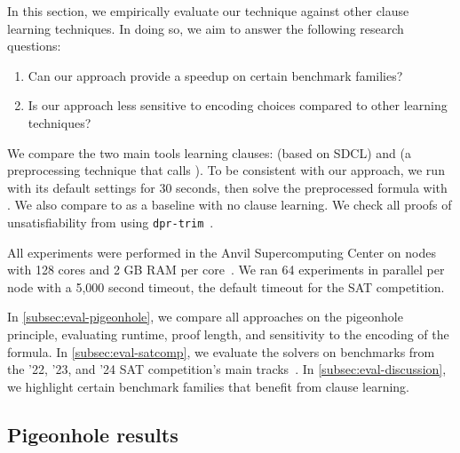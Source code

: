 In this section, we empirically evaluate our technique against other \pr clause
learning techniques. In doing so, we aim to answer the following research
questions:


\begin{enumerate}[label={RQ\arabic*}]
    \item Can our approach provide a speedup on certain benchmark
    families?
    \item Is our approach less sensitive to encoding choices compared to other
    \pr learning techniques?
\end{enumerate}


We compare the two main tools learning \pr clauses: \sadical (based on SDCL) and
\prelearn (a preprocessing technique that calls \sadical). To be consistent with
our approach, we run \prelearn with its default settings for 30 seconds, then
solve the preprocessed formula with \cadical. We also compare to \cadical as a
baseline with no \pr clause learning. We check all proofs of unsatisfiability
from \tool using \texttt{dpr-trim}~\cite{dpr-trim}.

All experiments were performed in the Anvil Supercomputing Center on nodes with
128 cores and 2 GB RAM per core~\cite{anvil}. We ran 64 experiments in parallel
per node with a 5,000 second timeout, the default timeout for the SAT
competition.

In \autoref{subsec:eval-pigeonhole}, we compare all approaches on the pigeonhole
principle, evaluating runtime, proof length, and sensitivity to the encoding of
the formula. In \autoref{subsec:eval-satcomp}, we evaluate the solvers on
benchmarks from the '22, '23, and '24 SAT competition's main
tracks~\cite{satcomp2022,satcomp2023,satcomp2024}. In
\autoref{subsec:eval-discussion}, we highlight certain benchmark families that
benefit from \pr clause learning.



\subsection{Pigeonhole results}~\label{subsec:eval-pigeonhole}


